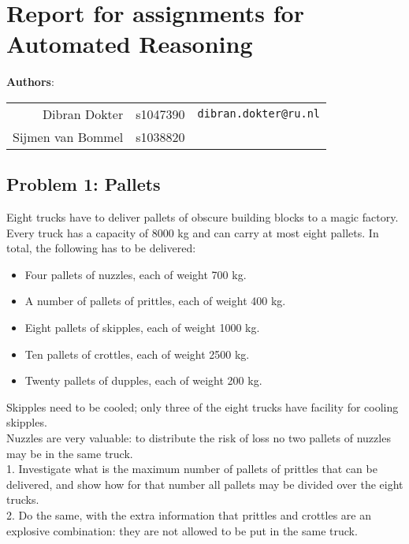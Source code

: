 \documentclass[12pt]{article}
\begin{document}
\section*{Report for assignments for Automated Reasoning}

\begin{center}
\textbf{Authors}: \\
\begin{tabular}{rcl}
Dibran Dokter & s1047390 & {\tt dibran.dokter@ru.nl} \\
Sijmen van Bommel & s1038820 
\end{tabular}
\end{center}

\vspace{8mm}

\subsection*{Problem 1: Pallets}

Eight trucks have to deliver pallets of obscure building blocks to a magic factory. Every truck
has a capacity of 8000 kg and can carry at most eight pallets. In total, the following has to
be delivered: \\
\begin{itemize}
    \item Four pallets of nuzzles, each of weight 700 kg.
    \item A number of pallets of prittles, each of weight 400 kg.
    \item Eight pallets of skipples, each of weight 1000 kg.
    \item Ten pallets of crottles, each of weight 2500 kg.
    \item Twenty pallets of dupples, each of weight 200 kg.
\end{itemize}

\vspace{8mm}

Skipples need to be cooled; only three of the eight trucks have facility for cooling skipples. \\
Nuzzles are very valuable: to distribute the risk of loss no two pallets of nuzzles may be
in the same truck. \\
1. Investigate what is the maximum number of pallets of prittles that can be delivered,
and show how for that number all pallets may be divided over the eight trucks.\\
2. Do the same, with the extra information that prittles and crottles are an explosive
combination: they are not allowed to be put in the same truck.\\
\end{document}

